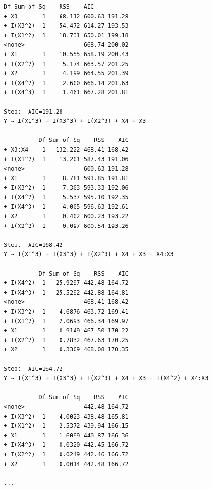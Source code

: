 \begin{lstlisting}[style=output]
          Df Sum of Sq    RSS    AIC
+ X3       1    68.112 600.63 191.28
+ I(X3^2)  1    54.472 614.27 193.53
+ I(X1^2)  1    18.731 650.01 199.18
<none>                 668.74 200.02
+ X1       1    10.555 658.19 200.43
+ I(X2^2)  1     5.174 663.57 201.25
+ X2       1     4.199 664.55 201.39
+ I(X4^2)  1     2.600 666.14 201.63
+ I(X4^3)  1     1.461 667.28 201.81

Step:  AIC=191.28
Y ~ I(X1^3) + I(X3^3) + I(X2^3) + X4 + X3

          Df Sum of Sq    RSS    AIC
+ X3:X4    1   132.222 468.41 168.42
+ I(X1^2)  1    13.201 587.43 191.06
<none>                 600.63 191.28
+ X1       1     8.781 591.85 191.81
+ I(X3^2)  1     7.303 593.33 192.06
+ I(X4^2)  1     5.537 595.10 192.35
+ I(X4^3)  1     4.005 596.63 192.61
+ X2       1     0.402 600.23 193.22
+ I(X2^2)  1     0.097 600.54 193.26

Step:  AIC=168.42
Y ~ I(X1^3) + I(X3^3) + I(X2^3) + X4 + X3 + X4:X3

          Df Sum of Sq    RSS    AIC
+ I(X4^2)  1   25.9297 442.48 164.72
+ I(X4^3)  1   25.5292 442.88 164.81
<none>                 468.41 168.42
+ I(X3^2)  1    4.6876 463.72 169.41
+ I(X1^2)  1    2.0693 466.34 169.97
+ X1       1    0.9149 467.50 170.22
+ I(X2^2)  1    0.7832 467.63 170.25
+ X2       1    0.3309 468.08 170.35

Step:  AIC=164.72
Y ~ I(X1^3) + I(X3^3) + I(X2^3) + X4 + X3 + I(X4^2) + X4:X3

          Df Sum of Sq    RSS    AIC
<none>                 442.48 164.72
+ I(X3^2)  1    4.0023 438.48 165.81
+ I(X1^2)  1    2.5372 439.94 166.15
+ X1       1    1.6099 440.87 166.36
+ I(X4^3)  1    0.0320 442.45 166.72
+ I(X2^2)  1    0.0249 442.46 166.72
+ X2       1    0.0014 442.48 166.72

...
\end{lstlisting}

